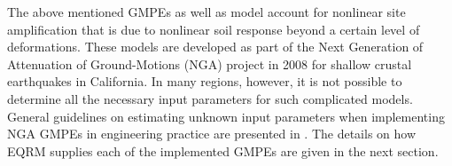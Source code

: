 The above mentioned GMPEs as well as \citep{eqrm_Boore08} model
account for nonlinear site amplification that is due to nonlinear
soil response beyond a certain level of deformations. These models
are developed as part of the Next Generation of Attenuation of
Ground-Motions (NGA) project in 2008 for shallow crustal earthquakes
in California. In many regions, however, it is not possible to
determine all the necessary input parameters for such complicated
models. General guidelines on estimating unknown input parameters
when implementing NGA GMPEs in engineering practice are presented in
\citet{eqrm_Kak11}. The details on how EQRM supplies each of the
implemented GMPEs are given in the next section.
\begin{table}[!t]
\centering
\renewcommand{\arraystretch}{1.3}
\caption{Functional forms of GMPEs for active tectonic regions}
\label{terms} 
\end{table}
